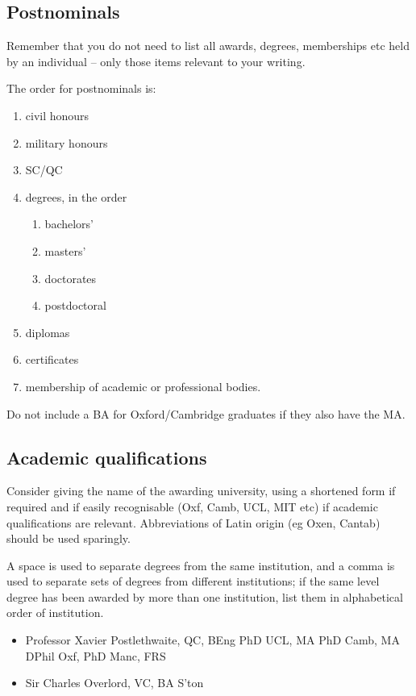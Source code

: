 \documentclass[11pt,a4paper]{book}
\newcommand{\cmark}{{\color{green(html/cssgreen)}\checkmark}}%
\begin{document}
	\subsection{Postnominals}
	Remember that you do not need to list all awards, degrees, memberships etc held by an individual -- only those items relevant to your writing.\par
	The order for postnominals is:
	\begin{enumerate}
		\item civil honours
		\item military honours
		\item SC/QC
		\newpage
		\item degrees, in the order
		\begin{enumerate}
			\item bachelors'
			\item masters'
			\item doctorates
			\item postdoctoral
		\end{enumerate}
		\item diplomas
		\item certificates
		\item membership of academic or professional bodies.
	\end{enumerate}
	Do not include a BA for Oxford/Cambridge graduates if they also have the MA.
	\subsection{Academic qualifications}
	Consider giving the name of the awarding university, using a shortened form if required and if easily recognisable (Oxf, Camb, UCL, MIT etc) if academic qualifications are relevant. Abbreviations of Latin origin (eg Oxen, Cantab) should be used sparingly.\par
	A space is used to separate degrees from the same institution, and a comma is used to separate sets of degrees from different institutions; if the same level degree has been awarded by more than one institution, list them in alphabetical order of institution.
	{\firasans \begin{mdframed}[backgroundcolor=aliceblue] \begin{itemize}[label=\cmark]
		\item Professor Xavier Postlethwaite, QC, BEng PhD UCL, MA PhD Camb, MA DPhil Oxf, PhD Manc, FRS
		\item Sir Charles Overlord, VC, BA S'ton
	\end{itemize} \end{mdframed} }
\end{document}

